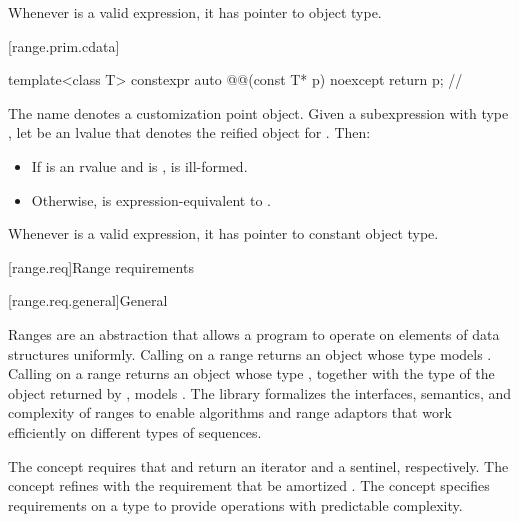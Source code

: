 \pnum
\begin{note}
Whenever  is a valid expression, it
has pointer to object type.
\end{note}

[range.prim.cdata]{}
%

\begin{codeblock}
template<class T>
constexpr auto @@(const T* p) noexcept { return p; }  // \expos
\end{codeblock}

\pnum
The name  denotes a customization point
object.
Given a subexpression  with type ,
let  be an lvalue that denotes the reified object for .
Then:
\begin{itemize}
\item
If  is an rvalue and
 is ,
 is ill-formed.
\item
Otherwise,
 is expression-equivalent to
.
\end{itemize}

\pnum
\begin{note}
Whenever  is a valid expression, it
has pointer to constant object type.
\end{note}

[range.req]{Range requirements}

[range.req.general]{General}

\pnum
Ranges are an abstraction that allows a \Cpp{} program
to operate on elements of data structures uniformly.
Calling  on a range returns an object
whose type models .
Calling  on a range returns an object whose type ,
together with the type  of the object returned by ,
models .
The library formalizes the interfaces, semantics, and complexity of ranges
to enable algorithms and range adaptors that work efficiently
on different types of sequences.

\pnum
The  concept requires that
 and 
return an iterator and a sentinel, respectively.
The  concept refines  with
the requirement that  be amortized .
The  concept specifies requirements on
a  type to provide operations with predictable complexity.

